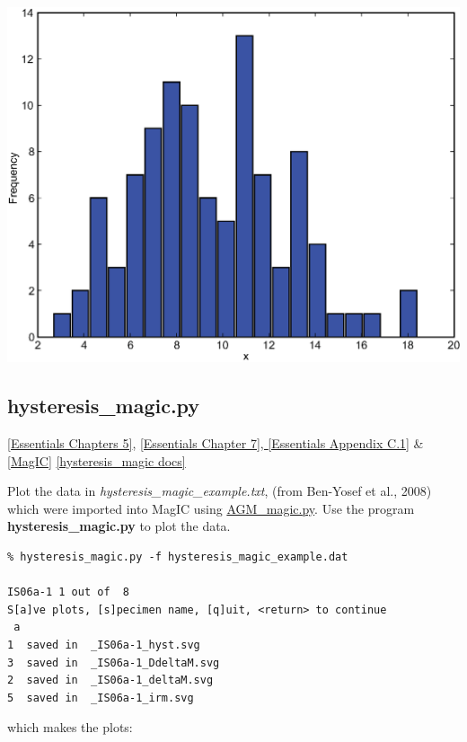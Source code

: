 \documentclass[11pt]{book}
\begin{document}
{{{  \includegraphics[width=15cm]{EPSfiles/hist.eps}

\subsection{hysteresis\_magic.py} 
\href{http://magician.ucsd.edu/Essentials_2/WebBook2ch5.html#ch5}{[Essentials Chapters 5]}, \href{http://magician.ucsd.edu/Essentials_2/WebBook2ch7.html#ch7}{[Essentials Chapter 7], }  \href{http://magician.ucsd.edu/Essentials_2/WebBook2ap3.html#hysteresis_parameters}{[Essentials Appendix C.1]} \& \href{#MagIC}{[MagIC]}
\href{http://earthref.org/PmagPy/pmagpydocs/hysteresis_magic-module.html}{[hysteresis\_magic docs]}

Plot the data in {\it hysteresis\_magic\_example.txt}, (from  Ben-Yosef et al., 2008) \nocite{benyosef08} which were imported into MagIC using  \href{#AGM_magic.py}{AGM\_magic.py}.   Use the program  {\bf hysteresis\_magic.py} to plot the data.   

\begin{verbatim}
% hysteresis_magic.py -f hysteresis_magic_example.dat

IS06a-1 1 out of  8
S[a]ve plots, [s]pecimen name, [q]uit, <return> to continue
 a
1  saved in  _IS06a-1_hyst.svg
3  saved in  _IS06a-1_DdeltaM.svg
2  saved in  _IS06a-1_deltaM.svg
5  saved in  _IS06a-1_irm.svg
\end{verbatim}

\noindent which makes the plots:


}}}
\end{document}
